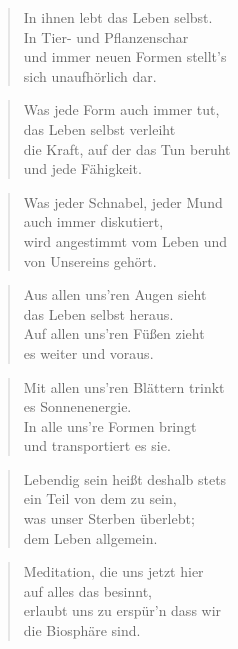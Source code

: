 \documentclass[10pt,a4paper]{article}
\begin{document}
\begin{multicols}{2}
\begin{verse}
In ihnen lebt das Leben selbst. \\
In Tier- und Pflanzenschar \\
und immer neuen Formen stellt’s \\
sich unaufhörlich dar. \\
\end{verse}

\begin{verse}
Was jede Form auch immer tut, \\
das Leben selbst verleiht \\
die Kraft, auf der das Tun beruht \\
und jede Fähigkeit. \\
\end{verse}

\begin{verse}
Was jeder Schnabel, jeder Mund \\
auch immer diskutiert, \\
wird angestimmt vom Leben und \\
von Unsereins gehört. \\
\end{verse}

\begin{verse}
Aus allen uns’ren Augen sieht \\
das Leben selbst heraus. \\
Auf allen uns’ren Füßen zieht \\
es weiter und voraus. \\
\end{verse}

\begin{verse}
Mit allen uns’ren Blättern trinkt \\
es Sonnenenergie. \\
In alle uns’re Formen bringt \\
und transportiert es sie. \\
\end{verse}

\begin{verse}
Lebendig sein heißt deshalb stets \\
ein Teil von dem zu sein, \\
was unser Sterben überlebt; \\
dem Leben allgemein. \\
\end{verse}

\begin{verse}
Meditation, die uns jetzt hier \\
auf alles das besinnt, \\
erlaubt uns zu erspür’n dass wir \\
die Biosphäre sind. \\
\end{verse}


\end{multicols}
\end{document}

